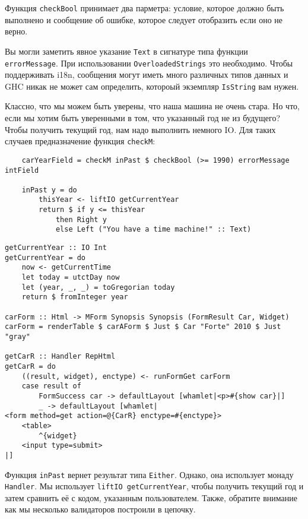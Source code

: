 Функция \lstinline'checkBool' принимает два парметра: условие, которое должно быть
выполнено и сообщение об ошибке, которое следует отобразить если оно не верно.
\begin{remark}
Вы могли заметить явное указание \lstinline'Text' в сигнатуре типа функции
\lstinline'errorMessage'. При использовании \lstinline'OverloadedStrings' это
необходимо. Чтобы поддерживать i18n, сообщения могут иметь много различных типов
данных и GHC никак не может сам определить, котороый экземпляр \lstinline'IsString' вам
нужен.
\end{remark}
Классно, что мы можем быть уверены, что наша машина не очень стара. Но что, если мы хотим
быть уверенными в том, что указанный год не из будущего? Чтобы получить текущий год, нам
надо выполнить немного IO. Для таких случаев предназначение функция \lstinline'checkM':

\begin{lstlisting}
    carYearField = checkM inPast $ checkBool (>= 1990) errorMessage intField

    inPast y = do
        thisYear <- liftIO getCurrentYear
        return $ if y <= thisYear
            then Right y
            else Left ("You have a time machine!" :: Text)
\end{lstlisting}

\begin{lstlisting}
getCurrentYear :: IO Int
getCurrentYear = do
    now <- getCurrentTime
    let today = utctDay now
    let (year, _, _) = toGregorian today
    return $ fromInteger year

carForm :: Html -> MForm Synopsis Synopsis (FormResult Car, Widget)
carForm = renderTable $ carAForm $ Just $ Car "Forte" 2010 $ Just "gray"

getCarR :: Handler RepHtml
getCarR = do
    ((result, widget), enctype) <- runFormGet carForm
    case result of
        FormSuccess car -> defaultLayout [whamlet|<p>#{show car}|]
        _ -> defaultLayout [whamlet|
<form method=get action=@{CarR} enctype=#{enctype}>
    <table>
        ^{widget}
    <input type=submit>
|]
\end{lstlisting}

Функция \lstinline'inPast' вернет результат типа \lstinline'Either'. Однако, она
использует монаду \lstinline'Handler'. Мы использует \lstinline'liftIO getCurrentYear',
чтобы получить текущий год и затем сравнить её с кодом, указанным пользователем. Также,
обратите внимание как мы несколько валидаторов построили в цепочку.

